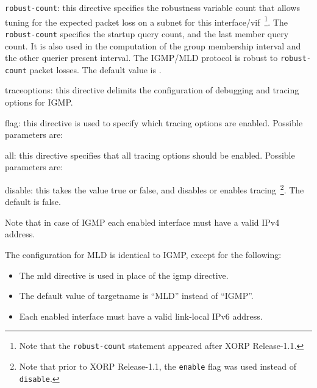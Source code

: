 \begin{description}
\begin{description}
\begin{description}
\item {\tt robust-count}: this directive specifies the robustness
  variable count that allows tuning for the expected packet loss on a
  subnet for this interface/vif~\footnote{Note that the {\tt robust-count}
  statement appeared after XORP Release-1.1.}.
  The {\tt robust-count} specifies the startup query count, and the last
  member query count.
  It is also used in the computation of the group membership interval and the
  other querier present interval.
  The IGMP/MLD protocol is robust to {\tt robust-count} packet losses.
  The default value is {}.

\end{description}
\end{description}
\item{\stt traceoptions}: this directive delimits the configuration of
  debugging and tracing options for IGMP.
\begin{description}
\item{\stt flag}: this directive is used to specify which tracing
  options are enabled.  Possible parameters are:
\begin{description}
\item{\stt all}: this directive specifies that all tracing
  options should be enabled.  Possible parameters are:
\begin{description}
\item{\stt disable}: this takes the value {\stt true} or {\stt false},
  and disables or enables tracing~\footnote{Note
  that prior to XORP Release-1.1, the {\tt enable} flag was used instead of
  {\tt disable}.}. The default is {\stt false}.
\end{description}
\end{description}
\end{description}
\end{description}

Note that in case of IGMP each enabled interface must have a valid IPv4
address.

The configuration for MLD is identical to IGMP, except for the
following:
\begin{itemize}
  \item The {\stt mld} directive is used in place of the {\stt igmp}
  directive.
  \item The default value of {\stt targetname} is {\stt ``MLD''}
  instead of {\stt ``IGMP''}.
  \item Each enabled interface must have a valid link-local IPv6
  address.
\end{itemize}


